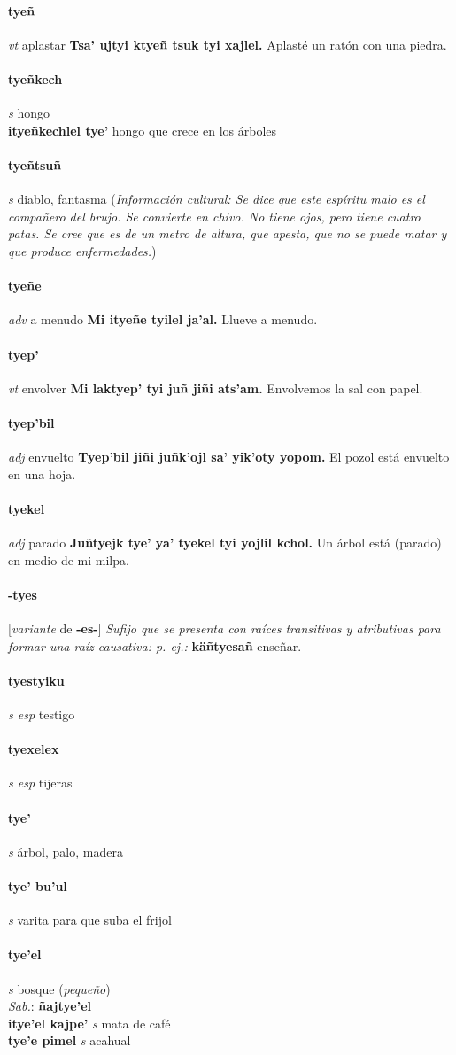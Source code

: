 \documentclass{scrbook}
\newcommand{\entry}[1]{\paragraph{#1}}
\newcommand{\nontranslationdef}[1]{\textit{#1}}
\newcommand{\partofspeech}[1]{\textit{#1}}
\newcommand{\spanishtranslation}[1]{#1}
\newcommand{\clarification}[1]{(\textit{#1})}
\newcommand{\cholexample}[1]{\textbf{#1}}
\newcommand{\exampletranslation}[1]{#1}
\newcommand{\dialectvariant}[1]{\\\textit{#1}:}
\newcommand{\dialectword}[1]{\textbf{#1}}
\newcommand{\culturalinformation}[1]{(\textit{#1})}
\newcommand{\secondaryentry}[1]{\\\textbf{#1}}
\newcommand{\secondpartofspeech}[1]{\textit{#1}}
\newcommand{\secondtranslation}[1]{#1}
\newcommand{\conjugationtense}[1]{[\textit{#1}}
\newcommand{\conjugationverb}[1]{de \textbf{#1}]}
\begin{document}
\begin{multicols}{2}
\entry{tyeñ}
\partofspeech{vt}
\spanishtranslation{aplastar}
\cholexample{Tsa' ujtyi ktyeñ tsuk tyi xajlel.}
\exampletranslation{Aplasté un ratón con una piedra.}

\entry{tyeñkech}
\partofspeech{s}
\spanishtranslation{hongo}
\secondaryentry{ityeñkechlel tye'}
\secondtranslation{hongo que crece en los árboles}

\entry{tyeñtsuñ}
\partofspeech{s}
\spanishtranslation{diablo, fantasma}
\culturalinformation{Información cultural: Se dice que este espíritu malo es el compañero del brujo. Se convierte en chivo. No tiene ojos, pero tiene cuatro patas. Se cree que es de un metro de altura, que apesta, que no se puede matar y que produce enfermedades.}

\entry{tyeñe}
\partofspeech{adv}
\spanishtranslation{a menudo}
\cholexample{Mi ityeñe tyilel ja'al.}
\exampletranslation{Llueve a menudo.}

\entry{tyep'}
\partofspeech{vt}
\spanishtranslation{envolver}
\cholexample{Mi laktyep' tyi juñ jiñi ats'am.}
\exampletranslation{Envolvemos la sal con papel.}

\entry{tyep'bil}
\partofspeech{adj}
\spanishtranslation{envuelto}
\cholexample{Tyep'bil jiñi juñk'ojl sa' yik'oty yopom.}
\exampletranslation{El pozol está envuelto en una hoja.}

\entry{tyekel}
\partofspeech{adj}
\spanishtranslation{parado}
\cholexample{Juñtyejk tye' ya' tyekel tyi yojlil kchol.}
\exampletranslation{Un árbol está (parado) en medio de mi milpa.}

\entry{-tyes}
\conjugationtense{variante}
\conjugationverb{-es-}
\nontranslationdef{Sufijo que se presenta con raíces transitivas y atributivas para formar una raíz causativa: p. ej.:}
\cholexample{käñtyesañ}
\exampletranslation{enseñar.}

\entry{tyestyiku}
\partofspeech{s esp}
\spanishtranslation{testigo}

\entry{tyexelex}
\partofspeech{s esp}
\spanishtranslation{tijeras}

\entry{tye'}
\partofspeech{s}
\spanishtranslation{árbol, palo, madera}

\entry{tye' bu'ul}
\partofspeech{s}
\spanishtranslation{varita para que suba el frijol}

\entry{tye'el}
\partofspeech{s}
\spanishtranslation{bosque}
\clarification{pequeño}
\dialectvariant{Sab.}
\dialectword{ñajtye'el}
\secondaryentry{itye'el kajpe'}
\secondpartofspeech{s}
\secondtranslation{mata de café}
\secondaryentry{tye'e pimel}
\secondpartofspeech{s}
\secondtranslation{acahual}


\end{multicols}
\end{document}
